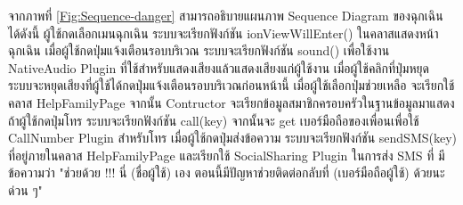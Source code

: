 จากภาพที่ \ref{Fig:Sequence-danger} สามารถอธิบายแผนภาพ Sequence Diagram ของฉุกเฉิน ได้ดังนี้ 
ผู้ใช้กดเลือกเมนฉุกเฉิน ระบบจะเรียกฟังก์ชัน ionViewWillEnter() ในคลาสแสดงหน้าฉุกเฉิน เมื่อผู้ใช้กดปุ่มแจ้งเตือนรอบบริเวณ ระบบจะเรียกฟังก์ชัน sound() เพื่อใช้งาน NativeAudio Plugin ที่ใช้สำหรับแสดงเสียงแล้วแสดงเสียงแก่ผู้ใช้งาน 
เมื่อผู้ใช้คลิกที่ปุ่มหยุด ระบบจะหยุดเสียงที่ผู้ใช้ได้กดปุ่มแจ้งเตือนรอบบริเวณก่อนหน้านี้ เมื่อผู้ใช้เลือกปุ่มช่วยเหลือ จะเรียกใช้คลาส HelpFamilyPage จากนั้น Contructor จะเรียกข้อมูลสมาชิกครอบครัวในฐานข้อมูลมาแสดง 
ถ้าผู้ใช้กดปุ่มโทร ระบบจะเรียกฟังก์ชัน call(key) จากนั้นจะ get เบอร์มือถือของเพื่อนเพื่อใช้ CallNumber Plugin สำหรับโทร เมื่อผู้ใช้กดปุ่มส่งข้อความ ระบบจะเรียกฟังก์ชัน sendSMS(key) ที่อยู่ภายในคลาส HelpFamilyPage และเรียกใช้ SocialSharing Plugin ในการส่ง SMS ที่
มีข้อความว่า "ช่วยด้วย !!! นี่ (ชื่อผู้ใช้) เอง ตอนนี้มีปัญหาช่วยติดต่อกลับที่ (เบอร์มือถือผู้ใช้) ด้วยนะ ด่วน ๆ"
